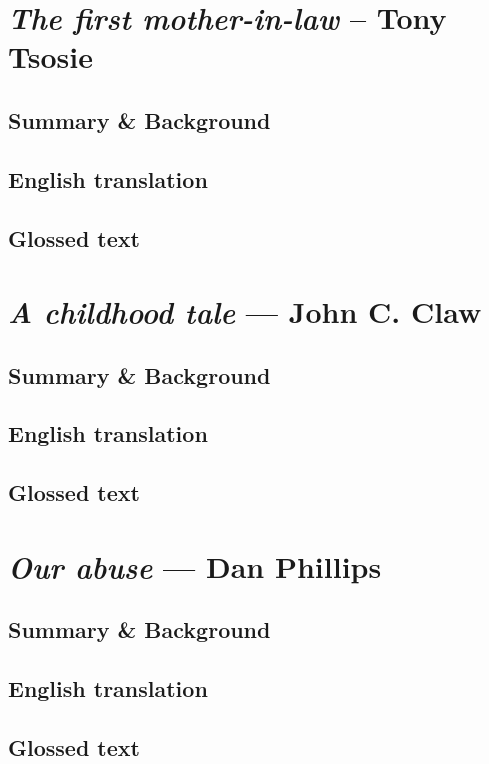 \documentclass[output=book,
		  ]{langscibook}
\begin{document}
    \chapter{\textit{The first mother-in-law} – Tony Tsosie}\label{chapter:text05}
    \setcounter{equation}{0}
        \tocless\section{Summary \& Background}
            
        \tocless\section{English translation}
             
           \tocless\section{Glossed text}
            
        \newpage
    \chapter{\textit{A childhood tale} — John C. Claw}\label{chapter:text06}
    \setcounter{equation}{0}
        \tocless\section{Summary \& Background}
            
        \tocless\section{English translation}
             
           \tocless\section{Glossed text}
            
        \newpage
    \chapter{\textit{Our abuse} — Dan Phillips}\label{chapter:text07}
    \setcounter{equation}{0}
        \tocless\section{Summary \& Background}
            
        \tocless\section{English translation}
             
           \tocless\section{Glossed text}
            
        \newpage
\end{document}
